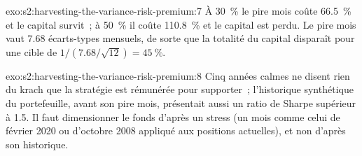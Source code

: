 \begin{solution}{exo:s2:harvesting-the-variance-risk-premium:7}
À 30~\% le pire mois coûte 66.5~\% et le capital survit~; à 50~\% il coûte 110.8~\% et le capital est perdu. Le pire mois vaut 7.68 écarts-types
mensuels, de sorte que la totalité du capital disparaît pour une cible de $1/(7.68/\sqrt{12}) = 45~\%$.
\end{solution}

\begin{solution}{exo:s2:harvesting-the-variance-risk-premium:8}
Cinq années calmes ne disent rien du krach que la stratégie est rémunérée pour supporter~; l'historique synthétique du portefeuille, avant son pire mois, présentait aussi un
ratio de Sharpe supérieur à 1.5. Il faut dimensionner le fonds d'après un stress (un mois comme celui de février 2020 ou d'octobre 2008 appliqué aux positions actuelles), et non d'après son historique.
\end{solution}

